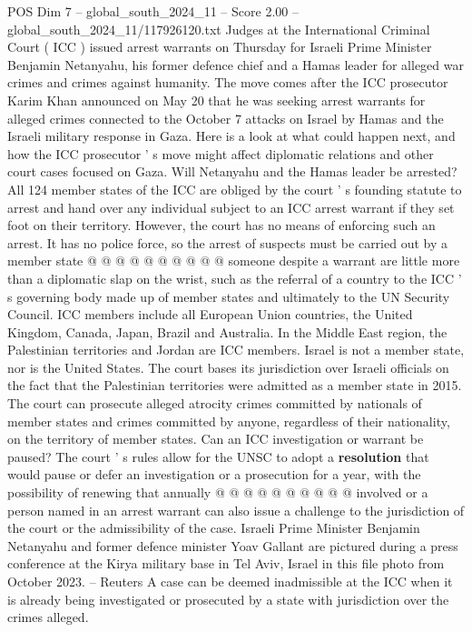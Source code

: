 \begin{textsample}{POS Dim 7 – global\_south\_2024\_11 – Score 2.00 – global\_south\_2024\_11/117926120.txt}  \label{ex:f7_pos_014}
Judges at the International Criminal Court ( ICC ) issued arrest warrants on Thursday for Israeli Prime Minister Benjamin Netanyahu, his former defence chief and a Hamas leader for alleged war crimes and crimes against humanity.
The move comes after the ICC prosecutor Karim Khan announced on May 20 that he was seeking arrest warrants for alleged crimes connected to the October 7 attacks on Israel by Hamas and the Israeli military response in Gaza.
Here is a look at what could happen next, and how the ICC prosecutor ' s move might affect diplomatic relations and other court cases focused on Gaza.
Will Netanyahu and the Hamas leader be arrested?
All 124 member states of the ICC are obliged by the court ' s founding statute to arrest and hand over any individual subject to an ICC arrest warrant if they set foot on their territory.
However, the court has no means of enforcing such an arrest.
It has no police force, so the arrest of suspects must be carried out by a member state @ @ @ @ @ @ @ @ @ @ someone despite a warrant are little more than a diplomatic slap on the wrist, such as the referral of a country to the ICC ' s governing body made up of member states and ultimately to the UN Security Council.
ICC members include all European Union countries, the United Kingdom, Canada, Japan, Brazil and Australia.
In the Middle East region, the Palestinian territories and Jordan are ICC members.
Israel is not a member state, nor is the United States.
The court bases its jurisdiction over Israeli officials on the fact that the Palestinian territories were admitted as a member state in 2015.
The court can prosecute alleged atrocity crimes committed by nationals of member states and crimes committed by anyone, regardless of their nationality, on the territory of member states.
Can an ICC investigation or warrant be paused?
The court ' s rules allow for the UNSC to adopt a \textbf{resolution} that would pause or defer an investigation or a prosecution for a year, with the possibility of renewing that annually @ @ @ @ @ @ @ @ @ @ involved or a person named in an arrest warrant can also issue a challenge to the jurisdiction of the court or the admissibility of the case.
Israeli Prime Minister Benjamin Netanyahu and former defence minister Yoav Gallant are pictured during a press conference at the Kirya military base in Tel Aviv, Israel in this file photo from October 2023. -- Reuters A case can be deemed inadmissible at the ICC when it is already being investigated or prosecuted by a state with jurisdiction over the crimes alleged.

\end{textsample}
